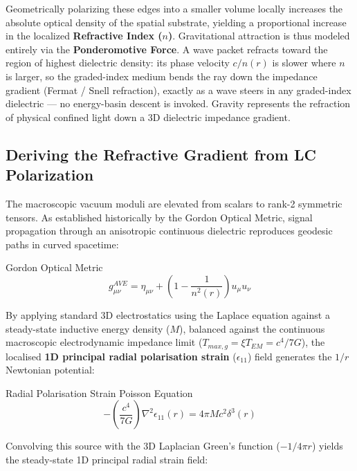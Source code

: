 Geometrically polarizing these edges into a smaller volume locally increases the absolute optical density of the spatial substrate, yielding a proportional increase in the localized \textbf{Refractive Index ($n$)}. Gravitational attraction is thus modeled entirely via the \textbf{Ponderomotive Force}. A wave packet refracts toward the region of highest dielectric density: its phase velocity $c/n(r)$ is slower where $n$ is larger, so the graded-index medium bends the ray down the impedance gradient (Fermat / Snell refraction), exactly as a wave steers in any graded-index dielectric --- no energy-basin descent is invoked. Gravity represents the refraction of physical confined light down a 3D dielectric impedance gradient.

\subsection{Deriving the Refractive Gradient from LC Polarization}

The macroscopic vacuum moduli are elevated from scalars to rank-2 symmetric tensors. As
established historically by the Gordon Optical Metric, signal propagation through an
anisotropic continuous dielectric reproduces geodesic paths in curved spacetime:

\begin{resultbox}{Gordon Optical Metric}
\begin{equation}
g_{\mu\nu}^{AVE}=\eta_{\mu\nu}+\left(1-\frac{1}{n^{2}(r)}\right)u_{\mu}u_{\nu}
\end{equation}
\end{resultbox}

By applying standard 3D electrostatics using the Laplace equation against a steady-state inductive energy density ($M$), balanced against the continuous macroscopic electrodynamic impedance limit ($T_{max,g} = \xi T_{EM} = c^{4}/7G$), the localised \textbf{1D principal radial polarisation strain} ($\epsilon_{11}$) field generates the $1/r$ Newtonian potential:

\begin{resultbox}{Radial Polarisation Strain Poisson Equation}
\begin{equation}
-\left(\frac{c^{4}}{7G}\right)\nabla^{2}\epsilon_{11}(r)=4\pi Mc^{2}\delta^{3}(r)
\end{equation}
\end{resultbox}

Convolving this source with the 3D Laplacian Green's function ($-1/4\pi r$) yields the steady-state 1D principal radial strain field:

